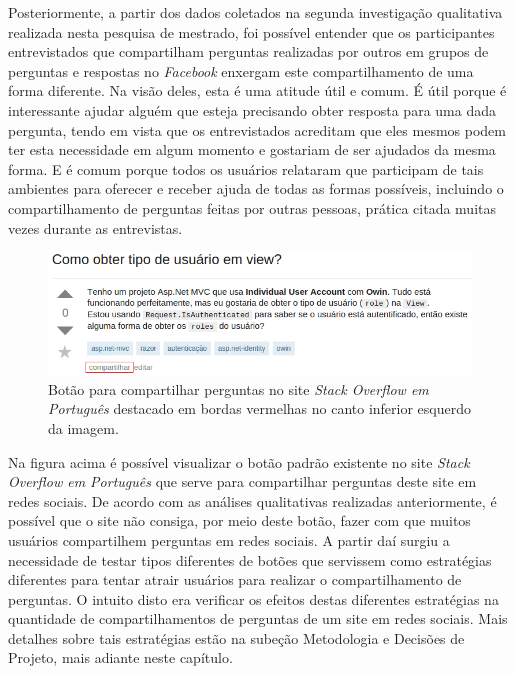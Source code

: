 Posteriormente, a partir dos dados coletados na segunda investigação qualitativa realizada nesta pesquisa de mestrado, foi possível entender que os participantes entrevistados que compartilham perguntas realizadas por outros em grupos de perguntas e respostas no \textit{Facebook} enxergam este compartilhamento de uma forma diferente. Na visão deles, esta é uma atitude útil e comum. É útil porque é interessante ajudar alguém que esteja precisando obter resposta para uma dada pergunta, tendo em vista que os entrevistados acreditam que eles mesmos podem ter esta necessidade em algum momento e gostariam de ser ajudados da mesma forma. E é comum porque todos os usuários relataram que participam de tais ambientes para oferecer e receber ajuda de todas as formas possíveis, incluindo o compartilhamento de perguntas feitas por outras pessoas, prática citada muitas vezes durante as entrevistas.

    \begin{figure}[H]
        \center
        \includegraphics[scale=0.6]{./figuras/botao-compartilhar-so-pt-editado.png}
        \caption{Botão para compartilhar perguntas no site \textit{Stack Overflow em Português} destacado em bordas vermelhas no canto inferior esquerdo da imagem.}
        \label{fig:botaoCompartilharSOPT}
    \end{figure}
    
Na figura acima é possível visualizar o botão padrão existente no site \textit{Stack Overflow em Português} que serve para compartilhar perguntas deste site em redes sociais. De acordo com as análises qualitativas realizadas anteriormente, é possível que o site não consiga, por meio deste botão, fazer com que muitos usuários compartilhem perguntas em redes sociais. A partir daí surgiu a necessidade de testar tipos diferentes de botões que servissem como estratégias diferentes para tentar atrair usuários para realizar o compartilhamento de perguntas. O intuito disto era verificar os efeitos destas diferentes estratégias na quantidade de compartilhamentos de perguntas de um site \qa em redes sociais. Mais detalhes sobre tais estratégias estão na subeção Metodologia e Decisões de Projeto, mais adiante neste capítulo.

